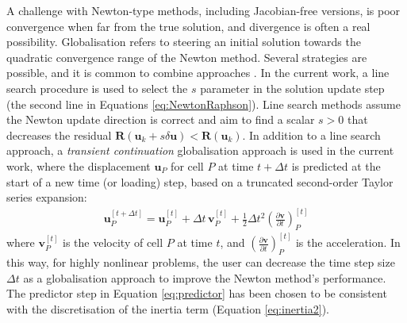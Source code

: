 \documentclass[sn-mathphys,Numbered]{sn-jnl}%
\newcommand{\bb}{\boldsymbol}
\begin{document}
A challenge with Newton-type methods, including Jacobian-free versions, is poor convergence when far from the true solution, and divergence is often a real possibility.
Globalisation refers to steering an initial solution towards the quadratic convergence range of the Newton method.
Several strategies are possible, and it is common to combine approaches \cite{Knoll2004}.
In the current work, a line search procedure is used to select the $s$ parameter in the solution update step (the second line in Equations \ref{eq:NewtonRaphson}).
Line search methods assume the Newton update direction is correct and aim to find a scalar $s > 0$ that decreases the residual $\bb{R}(\bb{u}_k + s \delta \bb{u}) < \bb{R}(\bb{u}_k)$.
In addition to a line search approach, a \emph{transient continuation} globalisation approach is used in the current work, where the displacement $\bb{u}_P$ for cell $P$ at time $t + \Delta t$ is predicted at the start of a new time (or loading) step, based on a truncated second-order Taylor series expansion:
\begin{eqnarray} \label{eq:predictor}
	\bb{u}^{[t+\Delta t]}_P = \bb{u}^{[t]}_P + \Delta t \, \bb{v}^{[t]}_P + \frac{1}{2} \Delta t^2 \left( \frac{\partial \bb{v}}{\partial t} \right)^{[t]}_P
\end{eqnarray}
where $\bb{v}^{[t]}_P$ is the velocity of cell $P$ at time $t$, and $\left( \frac{\partial \bb{v}}{\partial t} \right)^{[t]}_P$ is the acceleration.
In this way, for highly nonlinear problems, the user can decrease the time step size $\Delta t$ as a globalisation approach to improve the Newton method's performance.
The predictor step in Equation \ref{eq:predictor} has been chosen to be consistent with the discretisation of the inertia term (Equation \ref{eq:inertia2}).
\end{document}
